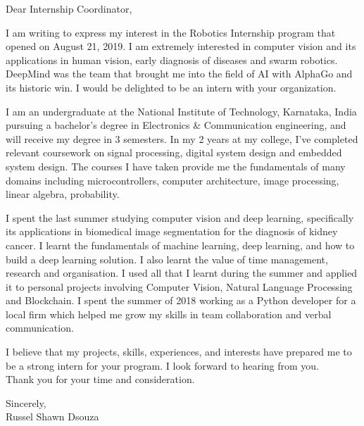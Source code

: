 \documentclass[11pt,a4paper,sans]{moderncv}
\begin{document}
  \date{August 23, 2019}
  \opening{Dear Internship Coordinator,}
  \makelettertitle

  I am writing to express my interest in the Robotics Internship program that opened on August 21, 2019. 
  I am extremely interested in computer vision and its applications in human vision, early diagnosis of diseases and swarm robotics. 
  DeepMind was the team that brought me into the field of AI with AlphaGo and its historic win. 
  I would be delighted to be an intern with your organization.

  I am an undergraduate at the National Institute of Technology, Karnataka, India pursuing a bachelor's degree in Electronics \& Communication
  engineering, and will receive my degree in 3 semesters. 
  In my 2 years at my college, I've completed relevant coursework on signal processing, digital system design and embedded system design. 
  The courses I have taken provide me the fundamentals of many domains including microcontrollers, computer architecture, image processing, linear algebra, probability.

  I spent the last summer studying computer vision and deep learning, specifically its applications in biomedical image segmentation for the diagnosis of kidney cancer. I learnt the fundamentals of machine learning, deep learning, and how to build a deep learning solution. 
  I also learnt the value of time management, research and organisation. 
  I used all that I learnt during the summer and applied it to personal projects involving Computer Vision, Natural Language Processing and Blockchain. 
  I spent the summer of 2018 working as a Python developer for a local firm which helped me grow my skills in team collaboration and verbal communication.

  I believe that my projects, skills, experiences, and interests have prepared me to be a strong intern for your program. 
  I look forward to hearing from you.\\
  Thank you for your time and consideration.

  Sincerely,\\
  Russel Shawn Dsouza
\end{document}
